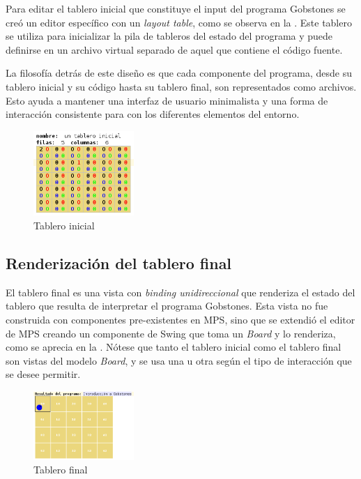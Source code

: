 Para editar el tablero inicial que constituye el input del programa Gobstones se creó un editor específico con un \textit{layout table}, como se observa en la . Este tablero se utiliza para inicializar la pila de tableros del estado del programa y puede definirse en un archivo virtual separado de aquel que contiene el código fuente. 

La filosofía detrás de este diseño es que cada componente del programa, desde su tablero inicial y su código hasta su tablero final, son representados como archivos. Esto ayuda a mantener una interfaz de usuario minimalista y una forma de interacción consistente para con los diferentes elementos del entorno.



  \begin{figure}
  \centering
  \includegraphics[width=0.34\textwidth]{assets/initial_board}
  \caption{Tablero inicial}
  \label{fig:initial_board}
  \end{figure}


\subsection{Renderización del tablero final}

El tablero final es una vista con \textit{binding unidireccional} que renderiza el estado del tablero que resulta de interpretar el programa Gobstones. Esta vista no fue construida con componentes pre-existentes en MPS, sino que se extendió el editor de MPS creando un componente de Swing que toma un \textit{Board} y lo renderiza, como se aprecia en la . Nótese que tanto el tablero inicial como el tablero final son vistas del modelo \textit{Board}, y se usa una u otra según el tipo de interacción que se desee permitir.


  \begin{figure}
  \centering
  \includegraphics[width=0.34\textwidth]{assets/result_board}
  \caption{Tablero final}
  \label{fig:result_board}
  \end{figure}


